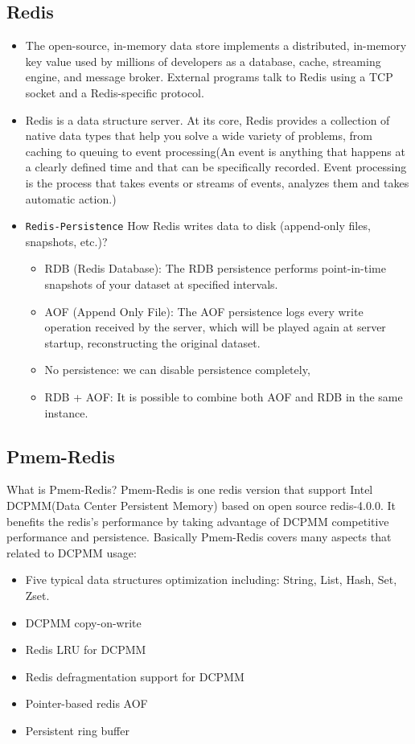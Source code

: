 \documentclass[11pt,swedish, openany, oneside]{book}
\begin{document}
\subsection{Redis}
\begin{itemize}
    \item The open-source, in-memory data store implements a distributed, in-memory key value used by millions of developers as a database, cache, streaming engine, and message broker. External programs talk to Redis using a TCP socket and a Redis-specific protocol.\cite{redis}
    
    \item Redis is a data structure server. At its core, Redis provides a collection of native data types that help you solve a wide variety of problems, from caching to queuing to event processing(An event is anything that happens at a clearly defined time and that can be specifically recorded. Event processing is the process that takes events or streams of events, analyzes them and takes automatic action.)

    \item \texttt{Redis-Persistence} How Redis writes data to disk (append-only files, snapshots, etc.)?
    \begin{itemize}
        \item RDB (Redis Database): The RDB persistence performs point-in-time snapshots of your dataset at specified intervals.
        \item AOF (Append Only File): The AOF persistence logs every write operation received by the server, which will be played again at server startup, reconstructing the original dataset.
        \item No persistence: we can disable persistence completely,
        \item RDB + AOF: It is possible to combine both AOF and RDB in the same instance.
    \end{itemize} 
\end{itemize}

\subsection{Pmem-Redis}
What is Pmem-Redis\cite{pmemredis}? Pmem-Redis is one redis version that support Intel DCPMM(Data Center Persistent Memory) based on open source redis-4.0.0. It benefits the redis's performance by taking advantage of DCPMM competitive performance and persistence. Basically Pmem-Redis covers many aspects that related to DCPMM usage:
\begin{itemize}
    \item Five typical data structures optimization including: String, List, Hash, Set, Zset.
    \item  DCPMM copy-on-write
    \item  Redis LRU for DCPMM
    \item  Redis defragmentation support for DCPMM
    \item  Pointer-based redis AOF
    \item  Persistent ring buffer
\end{itemize}
\end{document}

